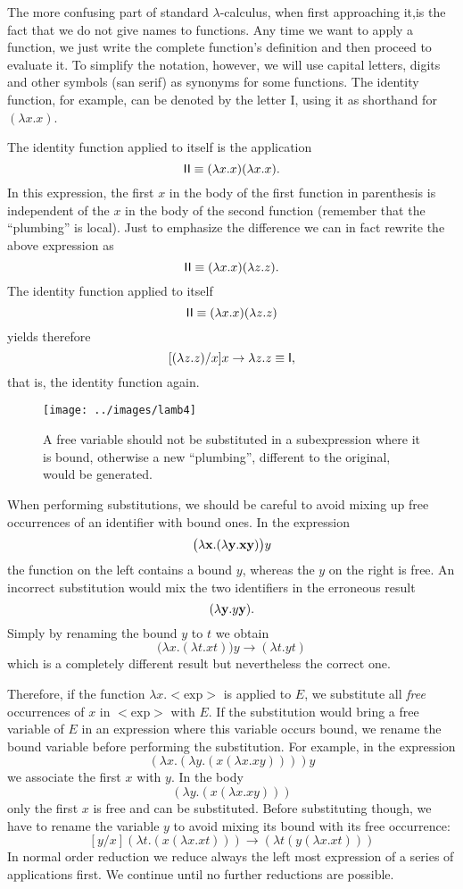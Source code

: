 The more confusing part of standard $\lambda$-calculus, when first approaching it,is the fact that we do not give names to functions. Any time we want to apply a function, we just write the complete function's definition  and then proceed to evaluate it. To simplify the notation, however, we will use capital letters, digits and other symbols (san serif) as synonyms for some functions. The identity function, for example, can be denoted by the letter {\sf I}, using it as shorthand for $(\lambda x.x)$.

The identity function applied to itself is the application $${\sf I}{\sf I}\equiv (\lambda x.x)(\lambda x.x).$$ In this expression, the first $x$ in the body of the first function in parenthesis is independent of the $x$ in the body of the second function (remember that the ``plumbing'' is local). Just to emphasize the difference we can in fact rewrite the above expression as $${\sf I}{\sf I}\equiv (\lambda x.x)(\lambda z.z).$$  The identity function applied to itself $${\sf I}{\sf I}\equiv (\lambda x.x)(\lambda z.z)$$ yields therefore
$$[(\lambda z.z)/x]x\rightarrow\lambda z.z \equiv{\sf I},$$ that is, the identity function again.

\begin{figure}[htb]
\centerline{\texttt{[image: ../images/lamb4]}}
\caption{A free variable should not be substituted in a subexpression where it is bound, otherwise a new ``plumbing'', different to the original, would be generated.\label{fig4}}
\end{figure} 

When performing substitutions, we should be careful  to avoid mixing up free occurrences of an identifier with bound ones. In the expression $$\bigl(\lambda {\bf x}.(\lambda {\bf y}.{\bf x}{\bf y})\bigr)y$$ the function on the left contains a bound $y$, whereas the $y$ on the right is free. An incorrect substitution would mix the two identifiers in the erroneous result $$(\lambda {\bf y}.y{\bf y}).$$ Simply by renaming the bound $y$ to $t$ we obtain $$\bigl(\lambda x.(\lambda t.xt)\bigr)y \rightarrow (\lambda t.yt)$$
which is a completely different result but nevertheless the correct one. 

Therefore, if the function $\lambda x.<\mbox{exp}>$ is applied to $E$, we substitute all {\it free\/} occurrences of $x$ in $<\mbox{exp}>$ with $E$. If the substitution would bring a free variable of $E$ in an expression where this variable occurs bound, we rename the bound variable before performing the substitution. For example, in the expression
$$
\left(\lambda x.(\lambda y.(x(\lambda x.xy)))\right)y
$$
we associate the first $x$ with $y$. In the body
$$\left(\lambda y.(x(\lambda x.xy))\right)$$
only the first $x$ is free and can be substituted. Before substituting though, we have to rename the variable $y$ to avoid mixing its bound with its free occurrence:
$$
[y/x]\left(\lambda t.(x(\lambda x.xt))\right) \rightarrow \left(\lambda t(y(\lambda x.xt))\right)
$$
In normal order reduction we reduce always the left most expression of a series of applications first. We continue until no further reductions are possible.

